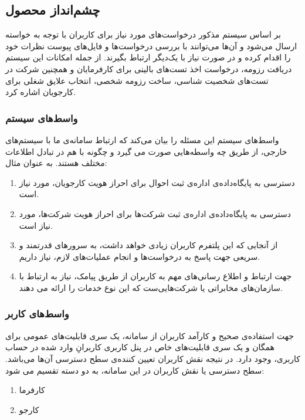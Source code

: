 \subsection{چشم‌انداز محصول}
بر اساس سیستم مذکور درخواست‌های مورد نیاز برای کاربران با توجه به خواسته ارسال می‌شود و آن‌ها می‌توانند با بررسی درخواست‌ها و فایل‌های پیوست نظرات خود را اقدام کرده و در صورت نیاز با یک‌دیگر ارتباط بگیرند.
از جمله امکانات این سیستم دریافت رزومه، درخواست اخذ تست‌های بالینی برای کارفرمایان و همچنین شرکت در تست‌های شخصیت شناسی، ساخت رزومه شخصی، انتخاب علایق شغلی برای کارجویان اشاره کرد.

\subsubsection{واسط‌های سیستم}
واسط‌های سیستم این مسئله را بیان می‌کند که ارتباط سامانه‌ی ما با سیستم‌های خارجی، از طریق چه واسطه‌هایی صورت می گیرد و چگونه با هم در تبادل اطلاعات مختلف هستند. به عنوان مثال:
\begin{enumerate}
	\item
	دسترسی به پایگاه‌داده‌ی اداره‌ی ثبت احوال برای احراز هویت کارجو‌یان، مورد نیاز است.
	\item
	دسترسی به پایگاه‌داده‌ی اداره‌ی ثبت شرکت‌ها برای احراز هویت شرکت‌ها، مورد نیاز است.
	\item
	از آنجایی که این پلتفرم کاربران زیادی خواهد داشت، به سرور‌های قدرتمند و سریعی جهت پاسخ به درخواست‌ها و انجام عملیات‌های لازم، نیاز داریم.
	\item
	جهت ارتباط و اطلاع رسانی‌های مهم به کاربران از طریق پیامک، نیاز به ارتباط با سازمان‌های مخابراتی یا شرکت‌هایی‌ست که این نوع خدمات را ارائه می دهند.
\end{enumerate}

\subsubsection{واسط‌های کاربر}
جهت استفاده‌ی صحیح و کارآمد کاربران از سامانه، یک سری قابلیت‌های عمومی برای همگان و یک سری قابلیت‌های خاص در پنل کاربری کاربرانِ وارد شده در حساب کاربری، وجود دارد. در نتیجه نقش کاربران تعیین کننده‌ی سطح دسترسی آن‌ها می‌باشد. سطح‌ دسترسی یا نقش کاربران در این سامانه، به دو دسته تقسیم می شود:
\begin{enumerate}
	\item
	کارفرما
	\item
	کارجو
\end{enumerate}
